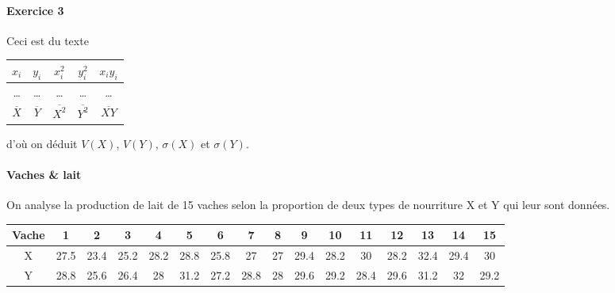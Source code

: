 \documentclass[10pt,a4paper,french]{article}
\begin{document}
\paragraph{Exercice 3}
Ceci est du texte
\begin{table}[h]
\centering
\begin{tabular}{ccccc}
$x_i$ & $y_i$ & $x_i^2$ & $y_i^2$ & $x_i y_i$ \\
\hline
\ldots & \ldots & \ldots & \ldots & \ldots \\
$\overline{X}$ & $\overline{Y}$ & $\overline{X^2}$ & $\overline{Y^2}$ & $\overline{X Y}$
\end{tabular}
\end{table}
d'où on déduit $V(X)$, $V(Y)$, $\sigma(X)$ et $\sigma(Y)$.

\paragraph{Vaches \& lait}
On analyse la production de lait de 15 vaches selon la proportion de deux types de nourriture X et Y qui leur sont données.
\begin{table}[h]
\centering
\begin{tabular}{c|ccccccccccccccc}
Vache & 1 & 2 & 3 & 4 & 5 & 6 & 7 & 8 & 9 & 10 & 11 & 12 & 13 & 14 & 15 \\
\hline
X & 27.5 & 23.4 & 25.2 & 28.2 & 28.8 & 25.8 & 27 & 27 & 29.4 & 28.2 & 30 & 28.2 & 32.4 & 29.4 & 30 \\
Y & 28.8 & 25.6 & 26.4 & 28 & 31.2 & 27.2 & 28.8 & 28 & 29.6 & 29.2 & 28.4 & 29.6 & 31.2 & 32 & 29.2
\end{tabular}
\end{table}
\end{document}
